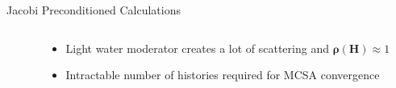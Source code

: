 \documentclass{beamer}
\begin{document}
\begin{frame}{Jacobi Preconditioned Calculations}
\begin{columns}
\begin{column}{0.5\textwidth}
    \end{column}

    \begin{column}{0.5\textwidth}
      \begin{itemize}
      \item Light water moderator creates a lot of scattering and
        $\mathbf{\rho}(\mathbf{H}) \approx 1$
        \medskip
      \item Intractable number of histories required for MCSA
        convergence 
      \end{itemize}
    \end{column}

  \end{columns}

\end{frame}
\end{document}
